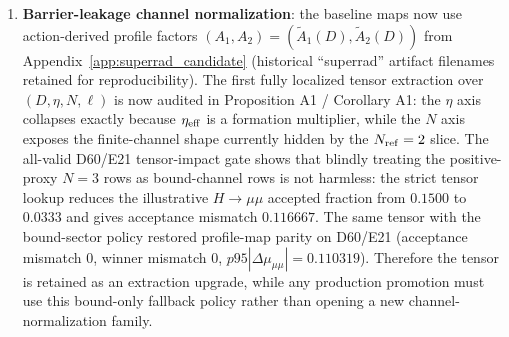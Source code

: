 \documentclass[aps,prd,onecolumn,notitlepage,nofootinbib,superscriptaddress,11pt,floatfix]{revtex4-2}
\begin{document}
\begin{enumerate}
    \item \textbf{Barrier-leakage channel normalization}: the baseline maps now use action-derived profile factors $(A_1,A_2)=(\tilde A_1(D),\tilde A_2(D))$ from Appendix~\ref{app:superrad_candidate} (historical ``superrad'' artifact filenames retained for reproducibility). The first fully localized tensor extraction over $(D,\eta,N,\ell)$ is now audited in Proposition A1 / Corollary A1: the $\eta$ axis collapses exactly because $\eta_{\rm eff}$ is a formation multiplier, while the $N$ axis exposes the finite-channel shape currently hidden by the $N_{\rm ref}=2$ slice. The all-valid D60/E21 tensor-impact gate shows that blindly treating the positive-proxy \(N=3\) rows as bound-channel rows is not harmless: the strict tensor lookup reduces the illustrative $H\to\mu\mu$ accepted fraction from $0.1500$ to $0.0333$ and gives acceptance mismatch $0.116667$. The same tensor with the bound-sector policy restored profile-map parity on D60/E21 (acceptance mismatch \(0\), winner mismatch \(0\), \(p95|\Delta\mu_{\mu\mu}|=0.110319\)). Therefore the tensor is retained as an extraction upgrade, while any production promotion must use this bound-only fallback policy rather than opening a new channel-normalization family.
\end{enumerate}
\end{document}
